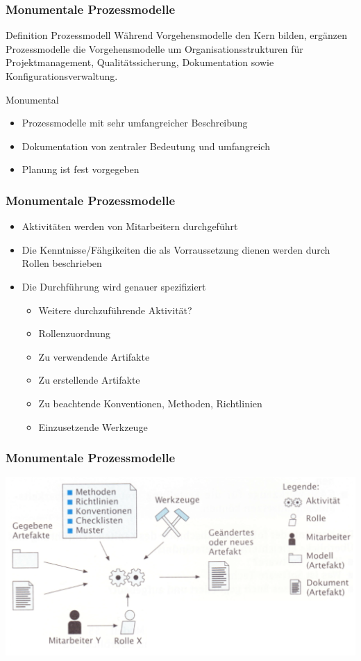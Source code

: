 \begin{frame}
\frametitle{Monumentale Prozessmodelle}
	\begin{block}{Definition Prozessmodell}
		Während Vorgehensmodelle den Kern bilden, ergänzen Prozessmodelle die Vorgehensmodelle um
		Organisationsstrukturen für Projektmanagement, Qualitätssicherung, Dokumentation sowie
		Konfigurationsverwaltung.
	\end{block}
	\bigskip
	\begin{block}{Monumental}
		\begin{itemize}
			\item Prozessmodelle mit sehr umfangreicher Beschreibung
			\item Dokumentation von zentraler Bedeutung und umfangreich
			\item Planung ist fest vorgegeben
		\end{itemize}
  \end{block}
\end{frame}

\begin{frame}
\frametitle{Monumentale Prozessmodelle}
	\begin{itemize}
		\item Aktivitäten werden von Mitarbeitern durchgeführt
		\item Die Kenntnisse/Fähgikeiten die als Vorraussetzung dienen
		werden durch Rollen beschrieben
		\item Die Durchführung wird genauer spezifiziert
		\begin{itemize}
			\item Weitere durchzuführende Aktivität?
			\item Rollenzuordnung
			\item Zu verwendende Artifakte
			\item Zu erstellende Artifakte
			\item Zu beachtende Konventionen, Methoden, Richtlinien
			\item Einzusetzende Werkzeuge
		\end{itemize}
	\end{itemize}
\end{frame}

\begin{frame}
\frametitle{Monumentale Prozessmodelle}
	\center\includegraphics[width=1\textwidth,
			keepaspectratio=true]{bilder/prozessmodell.png}
\end{frame}

